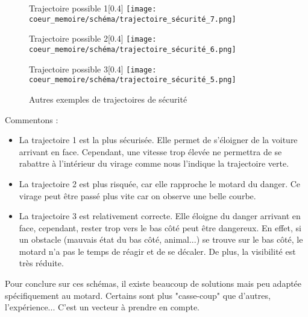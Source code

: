 \begin{figure}[H]
  \centering
  
  \begin{subcaptionbox}{Trajectoire possible 1\label{fig:img1}}[0.4\linewidth]
    {\texttt{[image: coeur\_memoire/schéma/trajectoire\_sécurité\_7.png]}}
  \end{subcaptionbox}
  \hfill
  \begin{subcaptionbox}{Trajectoire possible 2\label{fig:img2}}[0.4\linewidth]
    {\texttt{[image: coeur\_memoire/schéma/trajectoire\_sécurité\_6.png]}}
  \end{subcaptionbox}
  
  \vspace{0.5cm}
  
  \begin{subcaptionbox}{Trajectoire possible 3\label{fig:img3}}[0.4\linewidth]
    {\texttt{[image: coeur\_memoire/schéma/trajectoire\_sécurité\_5.png]}}
  \end{subcaptionbox}
  
  \caption{Autres exemples de trajectoires de sécurité}
  \label{fig:mosaique}
\end{figure}

Commentons :\
\begin{itemize}
    \item La trajectoire 1 est la plus sécurisée. Elle permet de s'éloigner de la voiture arrivant en face. Cependant, une vitesse trop élevée ne permettra de se rabattre à l'intérieur du virage comme nous l'indique la trajectoire verte.
    \item La trajectoire 2 est plus risquée, car elle rapproche le motard du danger. Ce virage peut être passé plus vite car on observe une belle courbe.
    \item La trajectoire 3 est relativement correcte. Elle éloigne du danger arrivant en face, cependant, rester trop vers le bas côté peut être dangereux. En effet, si un obstacle (mauvais état du bas côté, animal...) se trouve sur le bas côté, le motard n'a pas le temps de réagir et de se décaler. De plus, la visibilité est très réduite.
\end{itemize}
Pour conclure sur ces schémas, il existe beaucoup de solutions mais peu adaptée spécifiquement au motard. Certains sont plus "casse-coup" que d'autres, l'expérience... C'est un vecteur à prendre en compte.


